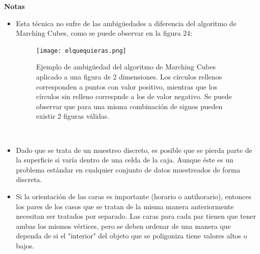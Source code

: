 \documentclass[12pt]{article}
\begin{document}
\textbf{Notas}
\begin{itemize}
\item Esta técnica no sufre de las ambigüedades a diferencia del algoritmo de Marching Cubes, como se puede observar en la figura 24:
\begin{figure}[h!]
\texttt{[image: elquequieras.png]}
\caption{Ejemplo de ambigüedad del algoritmo de Marching Cubes aplicado a una figura de 2 dimensiones. Los círculos rellenos corresponden a puntos con valor positivo, mientras que los círculos sin relleno correspnde a los de valor negativo. Se puede observar que para una misma combinación de signos pueden existir 2 figuras válidas.}
\end{figure}\\
\item Dado que se trata de un muestreo discreto, es posible que se pierda parte de la superficie si varía dentro de una celda de la caja. Aunque éste es un problema estándar en cualquier conjunto de datos muestreados de forma discreta.
\item Si la orientación de las caras es importante (horario o antihorario), entonces los pares de los casos que se tratan de la misma manera anteriormente necesitan ser tratados por separado. Las caras para cada par tienen que tener ambas los mismos vértices, pero se deben ordenar de una manera que dependa de si el "interior" del objeto que se poligoniza tiene valores altos o bajos.
\end{itemize}
\end{document}
